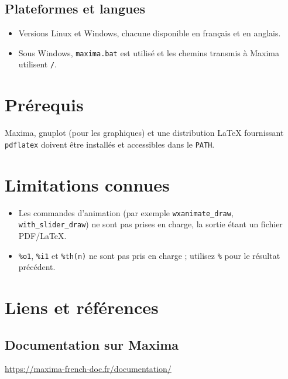 \documentclass[a4paper, 11pt]{article}
\begin{document}
\subsection*{Plateformes et langues}

\begin{itemize}

  \item Versions Linux et Windows, chacune disponible
  en français et en anglais.

  \item Sous Windows, \texttt{maxima.bat} est utilisé
  et les chemins transmis à Maxima utilisent \verb|/|.

\end{itemize}

\section*{Prérequis}

Maxima, gnuplot (pour les graphiques) et une distribution
\LaTeX{} fournissant \texttt{pdflatex} doivent être installés
et accessibles dans le \texttt{PATH}.

\section*{Limitations connues}

\begin{itemize}

  \item Les commandes d'animation
  (par exemple \verb|wxanimate_draw|,
  \verb|with_slider_draw|) ne sont pas prises en charge,
  la sortie étant un fichier PDF/\LaTeX.

  \item \verb|%o1|, \verb|%i1| et \verb|%th(n)|
  ne sont pas pris en charge ; utilisez \verb|%|
  pour le résultat précédent.

\end{itemize}


\section*{Liens et références }

\subsection*{Documentation sur Maxima}
\href{https://maxima-french-doc.fr/documentation/}{https://maxima-french-doc.fr/documentation/}
\end{document}
